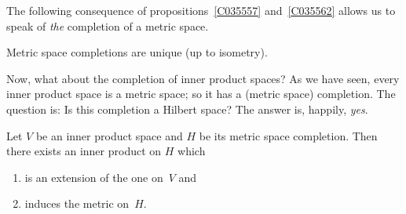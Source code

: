 The following consequence of propositions~\ref{C035557} and~\ref{C035562} allows us to
speak of \emph{the} completion of a metric space.

\begin{cor}\label{C035564} Metric space completions are unique (up to isometry).
\end{cor}

Now, what about the completion of inner product spaces?  As we have seen, every inner product space is a
metric space; so it has a (metric space) completion.  The question is: Is this completion a Hilbert space?
The answer is, happily, \emph{yes}.

\begin{thm} Let $V$ be an inner product space and $H$ be its metric space completion.  Then there exists
an inner product on $H$ which
  \begin{enumerate}
    \item is an extension of the one on~$V$ and
    \item induces the metric on~$H$.
  \end{enumerate}
\end{thm}




















\endinput
